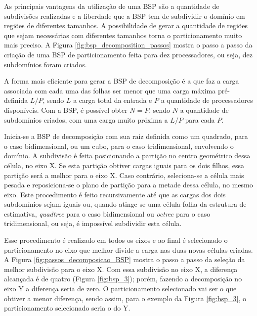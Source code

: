 As principais vantagens da utilização de uma BSP são a quantidade de subdivisões realizadas e a liberdade que a BSP tem de subdividir o domínio em regiões de diferentes tamanhos. A possibilidade de gerar a quantidade de regiões que sejam necessárias com diferentes tamanhos torna o particionamento muito mais preciso. A Figura \ref{fig:bsp_decomposition_passos} mostra o passo a passo da criação de uma BSP de particionamento feita para dez processadores, ou seja, dez subdomínios foram criados.

A forma mais eficiente para gerar a BSP de decomposição é a que faz a carga associada com cada uma das folhas ser menor que uma carga máxima pré-definida $L/P$, sendo $L$ a carga total da entrada e $P$ a quantidade de processadores disponíveis. Com a BSP, é possível obter $N=P$, sendo $N$ a quantidade de subdomínios criados, com uma carga muito próxima a $L/P$ para cada $P$.

Inicia-se a BSP de decomposição com sua raiz definida como um quadrado, para o caso bidimensional, ou um cubo, para o caso tridimensional, envolvendo o domínio. A subdivisão é feita posicionando a partição no centro geométrico dessa célula, no eixo X. Se esta partição obtiver cargas iguais para os dois filhos, essa partição será a melhor para o eixo X. Caso contrário, seleciona-se a célula mais pesada e reposiciona-se o plano de partição para a metade dessa célula, no mesmo eixo. Este procedimento é feito recursivamente até que as cargas dos dois subdomínios sejam iguais ou, quando atinge-se uma célula-folha da estrutura de estimativa, \textit{quadtree} para o caso bidimensional ou \textit{octree} para o caso tridimensional, ou seja, é impossível subdividir esta célula.

Esse procedimento é realizado em todos os eixos e ao final é selecionado o particionamento no eixo que melhor divide a carga nas duas novas células criadas. A Figura \ref{fig:passos_decomposicao_BSP} mostra o passo a passo da seleção da melhor subdivisão para o eixo X. Com essa subdivisão no eixo X, a diferença alcançada é de quatro (Figura \ref{fig:bsp_3}); porém, fazendo a decomposição no eixo Y a diferença seria de zero. O particionamento selecionado vai ser o que obtiver a menor diferença, sendo assim, para o exemplo da Figura \ref{fig:bsp_3}, o particionamento selecionado seria o do Y.


